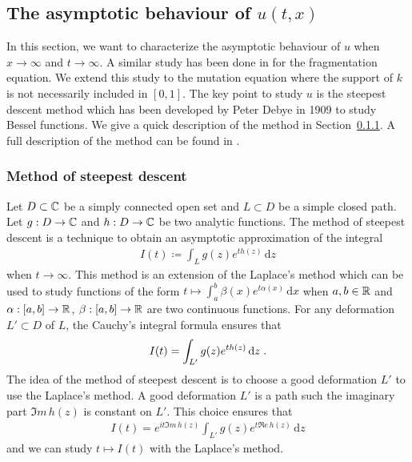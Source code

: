 \documentclass[11pt]{amsart}
\renewcommand{\Re}{\mathfrak{R}e}
\renewcommand{\Im}{\mathfrak{I}m}
\newcommand{\diff}{\,\mathrm{d}}
\begin{document}
    \subsection{The asymptotic behaviour of $u(t,x)$}\mbox{} 

    In this section, we want to characterize the asymptotic behaviour of $u$ when $x \to \infty$ and $t \to \infty$. A similar study has been done in \cite{doumic2016time} for the fragmentation equation. We extend this study to the mutation equation where the support of $k$ is not necessarily included in $[0, 1]$. 
    The key point to study $u$ is the steepest descent method which has been developed by Peter Debye in 1909 \cite{debye1909naherungsformeln} to study Bessel functions. We give a quick description of the method in Section~\ref{s:mth_col}. A full description of the method can be found in \cite{dieudonne1980calcul}. 

        \subsubsection{Method of steepest descent}
        \label{s:mth_col}
        Let $D \subset \mathbb{C}$ be a simply connected open set and $L \subset D$ be a simple closed path. Let $g:D \to \mathbb{C}$ and $h: D \to \mathbb{C}$ be two analytic functions.   
        The method of steepest descent is a technique to obtain an asymptotic approximation of the integral
        \begin{align*}
            I(t) \coloneqq \int_L g(z) e^{t h(z)} \diff z
        \end{align*} 
        when $t \to \infty$. This method is an extension of the Laplace's method \cite{laplace1986memoir} which can be used to study functions of the form $ t \mapsto \int_a^b \beta(x) e^{t\alpha(x)}\diff x$ when  $a,b \in \mathbb{R}$ and $\alpha : [a,b] \to \mathbb{R}$, $\beta : [a,b] \to \mathbb{R}$ are two continuous functions. 
        For any deformation $L' \subset D$ of $L$, the Cauchy's integral formula ensures that 
        \begin{align*}
            I(t) = \int_{L'} g(z) e^{t h(z)} \diff z
            \eqfinp
        \end{align*} 
        The idea of the method of steepest descent is to choose a good deformation $L'$ to use the Laplace's method. A good deformation $L'$ is a path such the imaginary part $\Im \, h(z)$ is constant on $L'$. This choice ensures that
        \begin{align*}
            I(t) =  e^{i t  \Im \, h(z)} \int_{L'} g(z) e^{t \Re \, h(z)} \diff z
        \end{align*}
        and we can study $t \mapsto I(t)$ with the Laplace's method.\\
\end{document}
